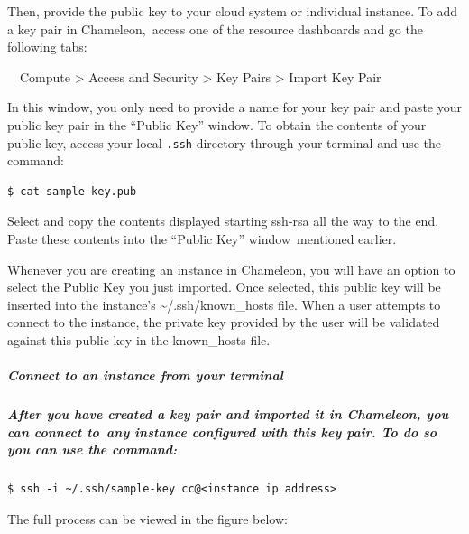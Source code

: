 Then, provide the public key to your cloud system or individual
instance. To add a key pair in Chameleon,~access one of the resource
dashboards and go the following tabs:

~~Compute \textgreater{} Access and Security \textgreater{} Key Pairs
\textgreater{} Import Key Pair

In this window, you only need to provide a name for your key pair and
paste your public key pair in the ``Public Key'' window. To obtain the
contents of your public key, access your local \texttt{.ssh} directory
through your terminal and use the command:

\begin{verbatim}
$ cat sample-key.pub
\end{verbatim}

Select and copy the contents displayed starting ssh-rsa all the way to
the end. Paste these contents into the ``Public Key'' window~mentioned
earlier.

Whenever you are creating an instance in Chameleon, you will have an
option to select the Public Key you just imported. Once selected, this
public key will be inserted into the instance's
\textasciitilde{}/.ssh/known\_hosts file. When a user attempts to
connect to the instance, the private key provided by the user will be
validated against this public key in the known\_hosts file.

\subparagraph{Connect to an instance from your
terminal}\label{connect-to-an-instance-from-your-terminal}

\subparagraph{After you have created a key pair and imported it in
Chameleon, you can connect to~any instance configured with this key
pair. To do so you can use the
command:}\label{after-you-have-created-a-key-pair-and-imported-it-in-chameleon-you-can-connect-toany-instance-configured-with-this-key-pair.-to-do-so-you-can-use-the-command}

\begin{verbatim}
$ ssh -i ~/.ssh/sample-key cc@<instance ip address>
\end{verbatim}

The full process can be viewed in the figure below:

